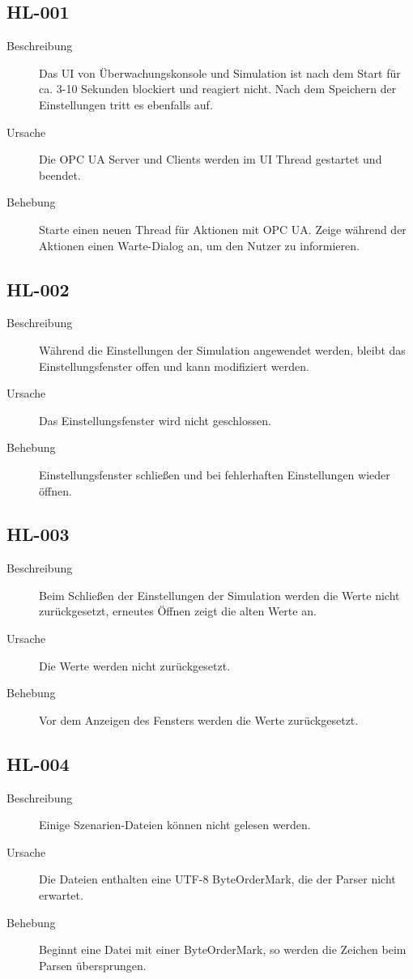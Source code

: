 \documentclass[parskip=full]{scrartcl}
\begin{document}
\subsection{HL-001}
\begin{description}
	\item[Beschreibung] Das UI von Überwachungskonsole und Simulation ist nach dem Start für ca. 3-10 Sekunden blockiert und reagiert nicht. Nach dem Speichern der Einstellungen tritt es ebenfalls auf.
	\item[Ursache] Die OPC UA Server und Clients werden im UI Thread gestartet und beendet.
	\item[Behebung] Starte einen neuen Thread für Aktionen mit OPC UA. Zeige während der Aktionen einen Warte-Dialog an, um den Nutzer zu informieren.
\end{description}

\subsection{HL-002}
\begin{description}
	\item[Beschreibung] Während die Einstellungen der Simulation angewendet werden, bleibt das Einstellungsfenster offen und kann modifiziert werden.
	\item[Ursache] Das Einstellungsfenster wird nicht geschlossen.
	\item[Behebung] Einstellungsfenster schließen und bei fehlerhaften Einstellungen wieder öffnen.
\end{description}

\subsection{HL-003}
\begin{description}
	\item[Beschreibung] Beim Schließen der Einstellungen der Simulation werden die Werte nicht zurückgesetzt, erneutes Öffnen zeigt die alten Werte an.
	\item[Ursache] Die Werte werden nicht zurückgesetzt.
	\item[Behebung] Vor dem Anzeigen des Fensters werden die Werte zurückgesetzt.
\end{description}

\subsection{HL-004}
\begin{description}
	\item[Beschreibung] Einige Szenarien-Dateien können nicht gelesen werden.
	\item[Ursache] Die Dateien enthalten eine UTF-8 ByteOrderMark, die der Parser nicht erwartet.
	\item[Behebung] Beginnt eine Datei mit einer ByteOrderMark, so werden die Zeichen beim Parsen übersprungen.
\end{description}

\pagebreak
{}
{}
\listoffigures
\end{document}
